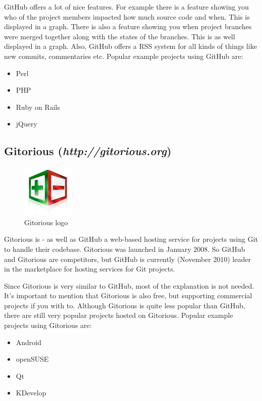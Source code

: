 GitHub offers a lot of nice features. For example there is a feature showing you who of the project members impacted how much source code and when. This is displayed in a graph. There is also a feature showing you when project branches were merged together along with the states of the branches. This is as well displayed in a graph. Also, GitHub offers a RSS system for all kinds of things like new commits, commentaries etc.
\newline
Popular example projects using GitHub are:
\newline
\begin{itemize}
	\item Perl
	\item PHP
	\item Ruby on Rails
	\item jQuery
\end{itemize}

\subsection{Gitorious (\textit{http://gitorious.org})}
\begin{figure}[h]
  \centering 
  \includegraphics{img/gitorious}
  \caption{Gitorious logo}
  \label{}
\end{figure}
Gitorious is - as well as GitHub a web-based hosting service for projects using Git to handle their codebase. Gitorious was launched in January 2008. So GitHub and Gitorious are competitors, but GitHub is currently (November 2010) leader in the marketplace for hosting services for Git projects.

Since Gitorious is very similar to GitHub, most of the explanation is not needed. It's important to mention that Gitorious is also free, but supporting commercial projects if you with to. Although Gitorious is quite less popular than GitHub, there are still very popular projects hosted on Gitorious.
\newline
Popular example projects using Gitorious are:
\begin{itemize}
	\item Android
	\item openSUSE
	\item Qt
	\item KDevelop
\end{itemize}


